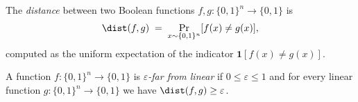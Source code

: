 \begin{definition}
\label{BoolBLR.bool_dist}
\leanok
{}
The \emph{distance} between two Boolean functions
$f, g : \{0,1\}^n \to \{0,1\}$ is
\[
  \dist(f, g) \;=\; \Pr_{x \sim \{0,1\}^n}[f(x) \ne g(x)],
\]
computed as the uniform expectation of the indicator $\mathbf{1}[f(x) \ne g(x)]$.
\end{definition}

\begin{definition}
\label{BoolBLR.epsilon_far_from_linear}
\leanok
{}
A function $f : \{0,1\}^n \to \{0,1\}$ is \emph{$\varepsilon$-far from linear}
if $0 \le \varepsilon \le 1$ and for every linear function
$g : \{0,1\}^n \to \{0,1\}$ we have $\dist(f, g) \ge \varepsilon$.
\end{definition}


